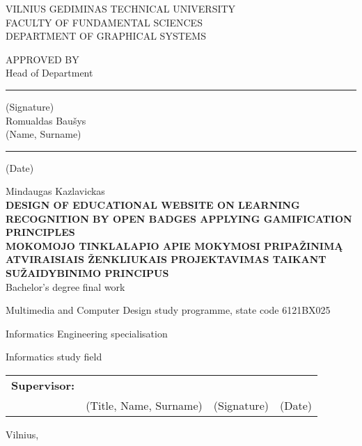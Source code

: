 \begin{titlepage}
\setcounter{page}{-1}
\centering
%
{\Large\scshape VILNIUS GEDIMINAS TECHNICAL UNIVERSITY}\\[0.2\baselineskip]
{\scshape FACULTY OF FUNDAMENTAL SCIENCES}\\[0.2\baselineskip]
{\scshape DEPARTMENT OF GRAPHICAL SYSTEMS}\\[0.2\baselineskip]
%
\vspace{\fill}
%
\begin{flushright}
\parbox{6cm}{%
APPROVED BY\\Head of Department
\bigskip
\begin{center}
\hrule\medskip
{\footnotesize (Signature)}\\[\baselineskip]
{Romualdas Baušys}\medskip\\
{\footnotesize (Name, Surname)}\\[\baselineskip]
\hrule\medskip
{\footnotesize (Date)}
\end{center}
}
\end{flushright}
%
\vspace{\fill}
%
{Mindaugas Kazlavickas}\\[3.0\baselineskip]

\MakeUppercase{\Large\bfseries Design of educational website on learning recognition by open badges applying gamification principles}\\[1.0\baselineskip]
\MakeUppercase{\Large\bfseries Mokomojo tinklalapio apie mokymosi pripažinimą atviraisiais ženkliukais projektavimas taikant sužaidybinimo principus}\\[1\baselineskip]

{Bachelor's degree final work}

\vspace{\fill}

Multimedia and Computer Design study programme, state code 6121BX025

Informatics Engineering specialisation

Informatics study field

\vspace{\fill}
%
\begin{flushright}
\parbox{0.7\textwidth}{
    \begin{tabular}{@{}l@{\hskip 0.5em}p{4cm}@{\hskip 1em}p{2cm}@{\hskip 0.5em}p{2cm}@{}}
        \textbf{Supervisor:} & \hrulefill & \hrulefill & \hrulefill \\
        & \centering\scriptsize (Title, Name, Surname) 
        & \centering\scriptsize (Signature) 
        & \centering\scriptsize (Date)
    \end{tabular}
}
\end{flushright}
%
\vspace{\fill}
%
Vilnius, \the\year
\end{titlepage}